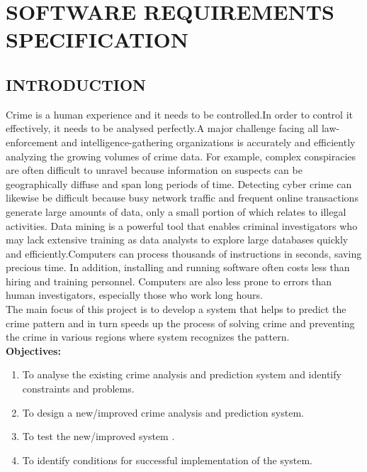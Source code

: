 \documentclass[12pt]{extreport}
\begin{document}

\chapter{SOFTWARE REQUIREMENTS SPECIFICATION}

\section{INTRODUCTION}
\hspace*{5em}Crime is a human experience and it needs to be controlled.In order to control it effectively, it needs to be analysed perfectly.A major challenge facing all law-enforcement and
intelligence-gathering organizations is accurately
and efficiently analyzing the growing volumes of
crime data. For example, complex conspiracies are
often difficult to unravel because information on
suspects can be geographically diffuse and span long
periods of time. Detecting cyber crime can likewise
be difficult because busy network traffic and frequent
online transactions generate large amounts
of data, only a small portion of which relates to illegal
activities.
Data mining is a powerful tool that enables criminal
investigators who may lack extensive training
as data analysts to explore large databases quickly
and efficiently.Computers can process thousands
of instructions in seconds, saving precious time. In
addition, installing and running software often costs
less than hiring and training personnel. Computers
are also less prone to errors than human investigators,
especially those who work long hours.\\


The main focus of this project is to develop a system that helps to predict the crime pattern and in turn speeds up the process of solving crime and preventing the crime in various regions where system recognizes the pattern.\\
\noindent
\textbf{Objectives:}
\begin{enumerate}
\item To analyse the existing crime analysis and prediction system and identify constraints and problems.

\item To design a new/improved crime analysis and prediction system.
\item To test the new/improved system .
\item To identify conditions for successful implementation of the system. 
\end{enumerate}
\end{document}
